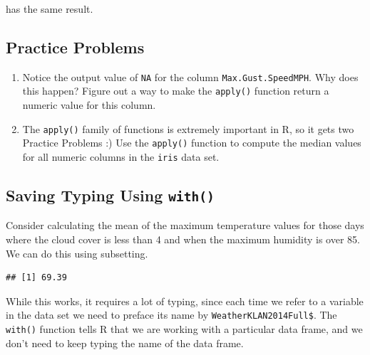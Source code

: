 \documentclass[
]{krantz}
\newenvironment{Shaded}{\begin{snugshade}}{\end{snugshade}}
\newcommand{\DecValTok}[1]{\textcolor[rgb]{0.00,0.00,0.81}{#1}}
\newcommand{\KeywordTok}[1]{\textcolor[rgb]{0.13,0.29,0.53}{\textbf{#1}}}
\newcommand{\NormalTok}[1]{#1}
\newcommand{\OperatorTok}[1]{\textcolor[rgb]{0.81,0.36,0.00}{\textbf{#1}}}
\newcommand{\StringTok}[1]{\textcolor[rgb]{0.31,0.60,0.02}{#1}}
\providecommand{\tightlist}{%
  \setlength{\itemsep}{0pt}\setlength{\parskip}{0pt}}
\begin{document}
has the same result.

\hypertarget{ch6PP1}{%
\subsection{Practice Problems}\label{ch6PP1}}

\begin{enumerate}
\def\labelenumi{\alph{enumi}.}
\tightlist
\item
  Notice the output value of \texttt{NA} for the column \texttt{Max.Gust.SpeedMPH}. Why does this happen? Figure out a way to make the \texttt{apply()} function return a numeric value for this column.
\item
  The \texttt{apply()} family of functions is extremely important in R, so it gets two Practice Problems :) Use the \texttt{apply()} function to compute the median values for all numeric columns in the \texttt{iris} data set.
\end{enumerate}

\hypertarget{saving-typing-using-with}{%
\subsection{\texorpdfstring{Saving Typing Using \texttt{with()}}{Saving Typing Using with()}}\label{saving-typing-using-with}}

Consider calculating the mean of the maximum temperature values for those days where the cloud cover is less than 4 and when the maximum humidity is over 85. We can do this using subsetting.

\begin{Shaded}
\end{Shaded}

\begin{verbatim}
## [1] 69.39
\end{verbatim}

While this works, it requires a lot of typing, since each time we refer to a variable in the data set we need to preface its name by \texttt{WeatherKLAN2014Full\$}. The \texttt{with()} function tells R that we are working with a particular data frame, and we don't need to keep typing the name of the data frame.
\end{document}
